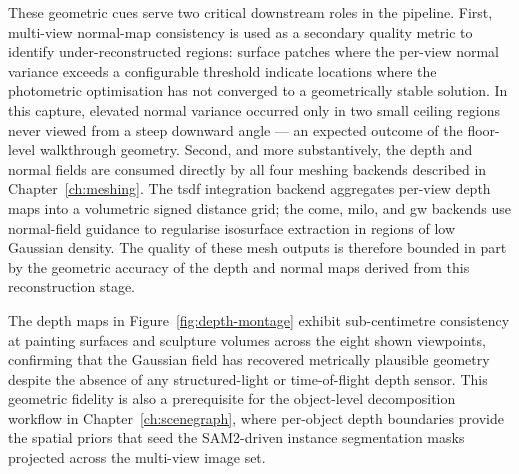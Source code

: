 These geometric cues serve two critical downstream roles in the pipeline. First, multi-view normal-map consistency is used as a secondary quality metric to identify under-reconstructed regions: surface patches where the per-view normal variance exceeds a configurable threshold indicate locations where the photometric optimisation has not converged to a geometrically stable solution. In this capture, elevated normal variance occurred only in two small ceiling regions never viewed from a steep downward angle — an expected outcome of the floor-level walkthrough geometry. Second, and more substantively, the depth and normal fields are consumed directly by all four meshing backends described in Chapter~\ref{ch:meshing}. The \acrshort{tsdf} integration backend aggregates per-view depth maps into a volumetric signed distance grid; the \acrshort{come}, \acrshort{milo}, and \acrshort{gw} backends use normal-field guidance to regularise isosurface extraction in regions of low Gaussian density. The quality of these mesh outputs is therefore bounded in part by the geometric accuracy of the depth and normal maps derived from this reconstruction stage.

The depth maps in Figure~\ref{fig:depth-montage} exhibit sub-centimetre consistency at painting surfaces and sculpture volumes across the eight shown viewpoints, confirming that the Gaussian field has recovered metrically plausible geometry despite the absence of any structured-light or time-of-flight depth sensor. This geometric fidelity is also a prerequisite for the object-level decomposition workflow in Chapter~\ref{ch:scenegraph}, where per-object depth boundaries provide the spatial priors that seed the SAM2-driven instance segmentation masks projected across the multi-view image set.
